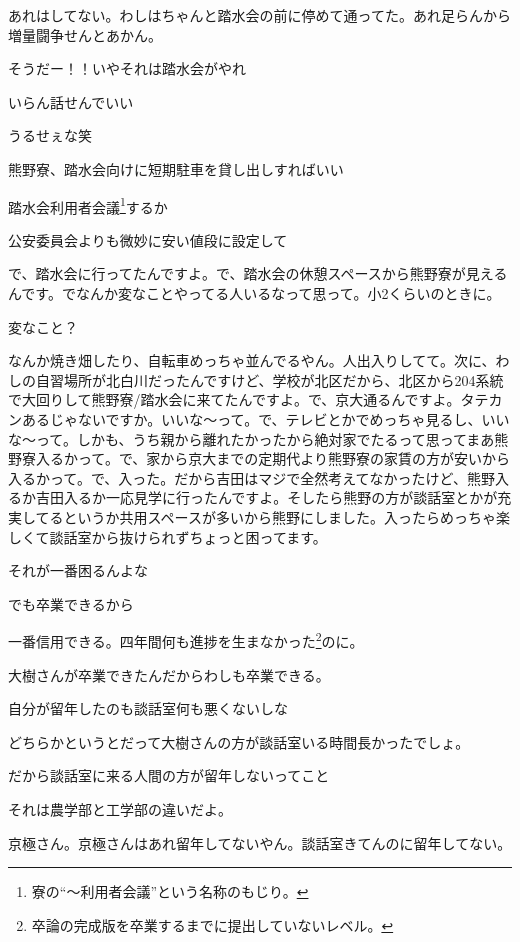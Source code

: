 \begin{multicols}{3}
あれはしてない。わしはちゃんと踏水会の前に停めて通ってた。あれ足らんから増量闘争せんとあかん。

そうだー！！いやそれは踏水会がやれ

いらん話せんでいい

うるせぇな笑

熊野寮、踏水会向けに短期駐車を貸し出しすればいい

踏水会利用者会議\footnote{寮の“～利用者会議”という名称のもじり。}するか

公安委員会よりも微妙に安い値段に設定して

で、踏水会に行ってたんですよ。で、踏水会の休憩スペースから熊野寮が見えるんです。でなんか変なことやってる人いるなって思って。小2くらいのときに。

変なこと？

なんか焼き畑したり、自転車めっちゃ並んでるやん。人出入りしてて。次に、わしの自習場所が北白川だったんですけど、学校が北区だから、北区から204系統で大回りして熊野寮/踏水会に来てたんですよ。で、京大通るんですよ。タテカンあるじゃないですか。いいな～って。で、テレビとかでめっちゃ見るし、いいな～って。しかも、うち親から離れたかったから絶対家でたるって思ってまあ熊野寮入るかって。で、家から京大までの定期代より熊野寮の家賃の方が安いから入るかって。で、入った。だから吉田はマジで全然考えてなかったけど、熊野入るか吉田入るか一応見学に行ったんですよ。そしたら熊野の方が談話室とかが充実してるというか共用スペースが多いから熊野にしました。入ったらめっちゃ楽しくて談話室から抜けられずちょっと困ってます。

それが一番困るんよな

でも卒業できるから

一番信用できる。四年間何も進捗を生まなかった\footnote{卒論の完成版を卒業するまでに提出していないレベル。}のに。

大樹さんが卒業できたんだからわしも卒業できる。

自分が留年したのも談話室何も悪くないしな

どちらかというとだって大樹さんの方が談話室いる時間長かったでしょ。

だから談話室に来る人間の方が留年しないってこと

それは農学部と工学部の違いだよ。

京極さん。京極さんはあれ留年してないやん。談話室きてんのに留年してない。


\end{multicols}
